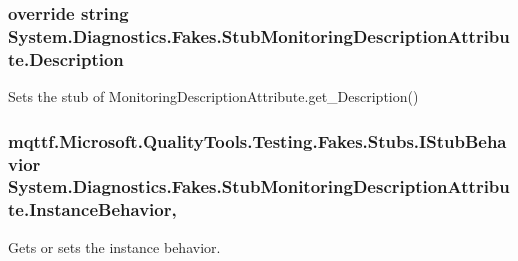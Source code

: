 \hypertarget{class_system_1_1_diagnostics_1_1_fakes_1_1_stub_monitoring_description_attribute_a6b084b3f0c336a2339c57b0b1e6ddd28}{
\subsubsection[{Description}]{\setlength{\rightskip}{0pt plus 5cm}override string System.\-Diagnostics.\-Fakes.\-Stub\-Monitoring\-Description\-Attribute.\-Description\hspace{0.3cm}{\ttfamily [get]}}}\label{class_system_1_1_diagnostics_1_1_fakes_1_1_stub_monitoring_description_attribute_a6b084b3f0c336a2339c57b0b1e6ddd28}


Sets the stub of Monitoring\-Description\-Attribute.\-get\-\_\-\-Description()

\hypertarget{class_system_1_1_diagnostics_1_1_fakes_1_1_stub_monitoring_description_attribute_a5ebdd0415a555b477606ed9f9867e5fa}{
\subsubsection[{Instance\-Behavior}]{\setlength{\rightskip}{0pt plus 5cm}mqttf.\-Microsoft.\-Quality\-Tools.\-Testing.\-Fakes.\-Stubs.\-I\-Stub\-Behavior System.\-Diagnostics.\-Fakes.\-Stub\-Monitoring\-Description\-Attribute.\-Instance\-Behavior\hspace{0.3cm}{\ttfamily [get]}, {\ttfamily [set]}}}\label{class_system_1_1_diagnostics_1_1_fakes_1_1_stub_monitoring_description_attribute_a5ebdd0415a555b477606ed9f9867e5fa}


Gets or sets the instance behavior.


